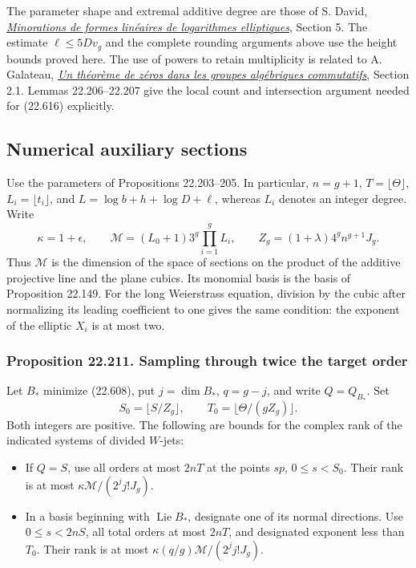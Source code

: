 \documentclass[
  11pt,
  a4paper,
]{article}
\providecommand{\tightlist}{%
  \setlength{\itemsep}{0pt}\setlength{\parskip}{0pt}}
\begin{document}
The parameter shape and extremal additive degree are those of S. David,
\href{https://smf.emath.fr/system/files/filepdf/MSMF_1995_2_62__1_0.pdf}{\emph{Minorations
de formes linéaires de logarithmes elliptiques}}, Section 5. The
estimate \(\ell\le5Dv_g\) and the complete rounding arguments above use
the height bounds proved here. The use of powers to retain multiplicity
is related to A. Galateau,
\href{https://www.numdam.org/item/10.5802/pmb.3.pdf}{\emph{Un théorème
de zéros dans les groupes algébriques commutatifs}}, Section 2.1. Lemmas
22.206--22.207 give the local count and intersection argument needed for
(22.616) explicitly.

\subsection{Numerical auxiliary
sections}\label{numerical-auxiliary-sections}

Use the parameters of Propositions 22.203--205. In particular,
\(n=g+1\), \(T=\lfloor\Theta\rfloor\), \(L_i=\lfloor t_i\rfloor\), and
\(L=\log b+h+\log D+\ell\), whereas \(L_i\) denotes an integer degree.
Write \[
 \kappa=1+\epsilon,\qquad
 \mathcal M=(L_0+1)3^g\prod_{i=1}^gL_i,
 \qquad Z_g=(1+\lambda)4^gn^{g+1}J_g.
 \tag{22.622}
\] Thus \(\mathcal M\) is the dimension of the space of sections on the
product of the additive projective line and the plane cubics. Its
monomial basis is the basis of Proposition 22.149. For the long
Weierstrass equation, division by the cubic after normalizing its
leading coefficient to one gives the same condition: the exponent of the
elliptic \(X_i\) is at most two.

\subsubsection{Proposition 22.211. Sampling through twice the target
order}\label{proposition-22.211.-sampling-through-twice-the-target-order}

Let \(B_*\) minimize (22.608), put \(j=\dim B_*\), \(q=g-j\), and write
\(Q=Q_{B_*}\). Set \[
 S_0=\lfloor S/Z_g\rfloor,\qquad
 T_0=\lfloor\Theta/(gZ_g)\rfloor.
 \tag{22.623}
\] Both integers are positive. The following are bounds for the complex
rank of the indicated systems of divided \(W\)-jets:

\begin{itemize}
\tightlist
\item
  If \(Q=S\), use all orders at most \(2nT\) at the points \(sp\),
  \(0\le s<S_0\). Their rank is at most
  \(\kappa\mathcal M/(2^j j!J_g)\).
\item
  In a basis beginning with \(\operatorname{Lie}B_*\), designate one of
  its normal directions. Use \(0\le s<2nS\), all total orders at most
  \(2nT\), and designated exponent less than \(T_0\). Their rank is at
  most \(\kappa(q/g)\mathcal M/(2^j j!J_g)\).
\end{itemize}
\end{document}
